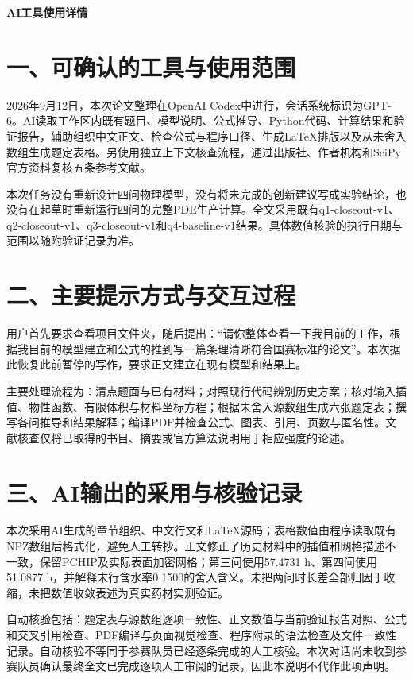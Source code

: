 

\small\linespread{1.08}\selectfont
\begin{center}{\Large\bfseries AI工具使用详情}\end{center}
\section*{一、可确认的工具与使用范围}
2026年9月12日，本次论文整理在OpenAI Codex中进行，会话系统标识为GPT-6。AI读取工作区内既有题目、模型说明、公式推导、Python代码、计算结果和验证报告，辅助组织中文正文、检查公式与程序口径、生成LaTeX排版以及从未舍入数组生成题定表格。另使用独立上下文核查流程，通过出版社、作者机构和SciPy官方资料复核五条参考文献。

本次任务没有重新设计四问物理模型，没有将未完成的创新建议写成实验结论，也没有在起草时重新运行四问的完整PDE生产计算。全文采用既有q1-closeout-v1、q2-closeout-v1、q3-closeout-v1和q4-baseline-v1结果。具体数值核验的执行日期与范围以随附验证记录为准。

\section*{二、主要提示方式与交互过程}
用户首先要求查看项目文件夹，随后提出：“请你整体查看一下我目前的工作，根据我目前的模型建立和公式的推到写一篇条理清晰符合国赛标准的论文”。本次据此恢复此前暂停的写作，要求正文建立在现有模型和结果上。

主要处理流程为：清点题面与已有材料；对照现行代码辨别历史方案；核对输入插值、物性函数、有限体积与材料坐标方程；根据未舍入源数组生成六张题定表；撰写各问推导和结果解释；编译PDF并检查公式、图表、引用、页数与匿名性。文献核查仅将已取得的书目、摘要或官方算法说明用于相应强度的论述。

\section*{三、AI输出的采用与核验记录}
本次采用AI生成的章节组织、中文行文和LaTeX源码；表格数值由程序读取既有NPZ数组后格式化，避免人工转抄。正文修正了历史材料中的插值和网格描述不一致，保留PCHIP及实际表面加密网格；第三问使用57.4731 h、第四问使用51.0877 h，并解释末行含水率0.1500的舍入含义。未把两问时长差全部归因于收缩，未把数值收敛表述为真实药材实测验证。

自动核验包括：题定表与源数组逐项一致性、正文数值与当前验证报告对照、公式和交叉引用检查、PDF编译与页面视觉检查、程序附录的语法检查及文件一致性记录。自动核验不等同于参赛队员已经逐条完成的人工核验。本次对话尚未收到参赛队员确认最终全文已完成逐项人工审阅的记录，因此本说明不代作此项声明。

